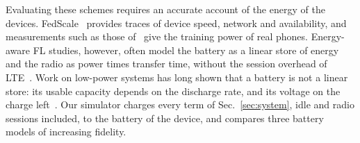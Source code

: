 Evaluating these schemes requires an accurate account of the energy of the
devices. FedScale~\cite{lai2022fedscale} provides traces of device speed,
network and availability, and measurements such as those
of~\cite{xu2022mandheling} give the training power of real phones. Energy-aware
FL studies, however, often model the battery as a linear store of energy and
the radio as power times transfer time, without the session overhead of
LTE~\cite{huang2012lte}. Work on low-power systems has long shown that a
battery is not a linear store: its usable capacity depends on the discharge
rate, and its voltage on the charge left~\cite{rakhmatov2003energy,jongerden2009battery}.
Our simulator charges every term of Sec.~\ref{sec:system}, idle and radio
sessions included, to the battery of the device, and compares three battery
models of increasing fidelity.
